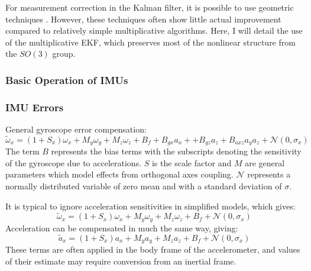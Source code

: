 For measurement correction in the Kalman filter, it is possible to use geometric techniques \cite{barrau_invariant_2017, potokar_introduction_2024, van_goor_equivariant_2023}. However, these techniques often show little actual improvement compared to relatively simple multiplicative algorithms. Here, I will detail the use of the multiplicative EKF, which preserves most of the nonlinear structure from the $SO(3)$ group.



\subsubsection{Basic Operation of IMUs}


 
\subsubsection{IMU Errors}
General gyroscope error compensation:
$${\tilde\omega_x}=(1+S_x)\omega_x+M_y\omega_y+M_z\omega_z+B_f+B_{gx}a_x++B_{gz}a_z+B_{axz}a_ya_z+\mathcal{N}(0,\sigma_x)$$
The term $B$ represents the bias terms with the subscripts denoting the sensitivity of the gyroscope due to accelerations. $S$ is the scale factor and $M$ are general parameters which model effects from orthogonal axes coupling. $\mathcal{N}$ represents a normally distributed variable of zero mean and with a standard deviation of $\sigma$.

It is typical to ignore acceleration sensitivities in simplified models, which gives:
$${\tilde\omega_x}=(1+S_x)\omega_x+M_y\omega_y+M_z\omega_z+B_f+\mathcal{N}(0,\sigma_x)$$
Acceleration can be compensated in much the same way, giving:
$${\tilde a_x}=(1+S_x)a_x+M_ya_y+M_za_z+B_f+\mathcal{N}(0,\sigma_x)$$
These terms are often applied in the body frame of the accelerometer, and values of their estimate may require conversion from an inertial frame.

